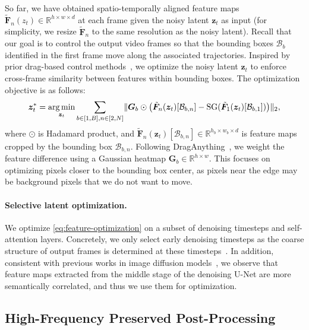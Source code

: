 So far, we have obtained spatio-temporally aligned feature maps $\tilde{\bm{F}}_n(z_t) \in \mathbb{R}^{h \times w \times d}$ at each frame given the noisy latent $\bm{z}_t$ as input (for simplicity, we resize $\tilde{\bm{F}}_n$ to the same resolution as the noisy latent).
Recall that our goal is to control the output video frames so that the bounding boxes $\mathcal{B}_b$ identified in the first frame move along the associated trajectories.  
Inspired by prior drag-based control methods~\citep{shi2024dragdiffusion,pan2023drag}, we optimize the noisy latent $\bm{z}_t$ to enforce cross-frame similarity between features within bounding boxes. 
The optimization objective is as follows:
\begin{equation}\label{eq:feature-optimization}
    \bm{z}_t^* = \operatorname*{arg\,min}_{\bm{z}_t} \sum_{b\in[1, B], n\in[2, N]}\lVert \bm{G}_{b} \odot \left(\tilde{\bm{F}}_n(\bm{z}_t)[\mathcal{B}_{b, n}] - \mathrm{SG}(\tilde{\bm{F}}_1(\bm{z}_t)[\mathcal{B}_{b, 1}])\right) \rVert_2,
\end{equation}
where $\odot$ is Hadamard product, and $\tilde{\bm{F}}_n(\bm{z}_t)[\mathcal{B}_{b, n}] \in \mathbb{R}^{h_b \times w_b \times d}$ is feature maps cropped by the bounding box $\mathcal{B}_{b, n}$. 
Following DragAnything~\citep{wu2024draganything}, we weight the feature difference using a Gaussian heatmap $\bm{G}_{b} \in \mathbb{R}^{h \times w}$. This focuses on optimizing pixels closer to the bounding box center, as pixels near the edge may be background pixels that we do not want to move. 
\vspace{-2.5mm}
\paragraph{Selective latent optimization.}
We optimize \cref{eq:feature-optimization} on a subset of denoising timesteps and self-attention layers.
Concretely, we only select early denoising timesteps as the coarse structure of output frames is determined at these timesteps~\citep{DMProcessAnalyze,materzynska2023customizing}.
In addition, consistent with previous works in image diffusion models~\citep{shi2024dragdiffusion,mou2023dragondiffusion}, we observe that feature maps extracted from the middle stage of the denoising U-Net are more semantically correlated, and thus we use them for optimization.

\vspace{-2.0mm}
\subsection{High-Frequency Preserved Post-Processing}
\label{sec:fft}


